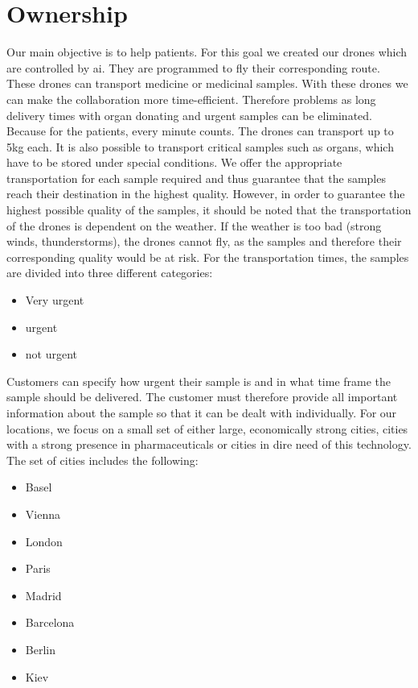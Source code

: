 \chapter{Ownership} \label{ownership}
Our main objective is to help patients. For this goal we created our drones which are controlled by \ac{ai}. They are programmed to fly their corresponding route. These drones can transport medicine or medicinal samples. With these drones we can make the collaboration more time-efficient. Therefore problems as long delivery times with organ donating and urgent samples can be eliminated. Because for the patients, every minute counts. The drones can transport up to 5kg each. It is also possible to transport critical samples such as organs, which have to be stored under special conditions. We offer the appropriate transportation for each sample required and thus guarantee that the samples reach their destination in the highest quality. However, in order to guarantee the highest possible quality of the samples, it should be noted that the transportation of the drones is dependent on the weather. If the weather is too bad (strong winds, thunderstorms), the drones cannot fly, as the samples and therefore their corresponding quality would be at risk. For the transportation times, the samples are divided into three different categories:
\begin{itemize}
  \item Very urgent
  \item urgent
  \item not urgent
\end{itemize}
Customers can specify how urgent their sample is and in what time frame the sample should be delivered. The customer must therefore provide all important information about the sample so that it can be dealt with individually.
\newline
\newline
For our locations, we focus on a small set of either large, economically strong cities, cities with a strong presence in pharmaceuticals or cities in dire need of this technology. The set of cities includes the following:
\begin{itemize}
  \item Basel
  \item Vienna
  \item London
  \item Paris
  \item Madrid
  \item Barcelona
  \item Berlin
  \item Kiev
\end{itemize}
